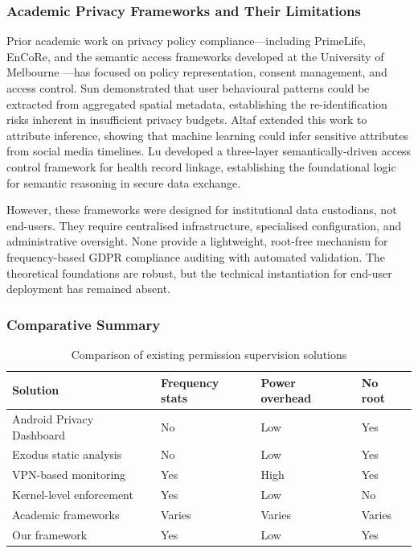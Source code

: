 \subsubsection{Academic Privacy Frameworks and Their Limitations}
Prior academic work on privacy policy compliance—including PrimeLife, EnCoRe, and the semantic access frameworks developed at the University of Melbourne \cite{15, 16, 17}—has focused on policy representation, consent management, and access control. Sun \cite{15} demonstrated that user behavioural patterns could be extracted from aggregated spatial metadata, establishing the re-identification risks inherent in insufficient privacy budgets. Altaf \cite{16} extended this work to attribute inference, showing that machine learning could infer sensitive attributes from social media timelines. Lu \cite{17} developed a three-layer semantically-driven access control framework for health record linkage, establishing the foundational logic for semantic reasoning in secure data exchange.

However, these frameworks were designed for institutional data custodians, not end-users. They require centralised infrastructure, specialised configuration, and administrative oversight. None provide a lightweight, root-free mechanism for frequency-based GDPR compliance auditing with automated validation. The theoretical foundations are robust, but the technical instantiation for end-user deployment has remained absent.

\subsubsection{Comparative Summary}
\begin{table}[H]
\centering
\caption{Comparison of existing permission supervision solutions}
\begin{tabular}{p{3cm}p{2.5cm}p{2.5cm}p{2.5cm}}
\toprule
\textbf{Solution} & \textbf{Frequency stats} & \textbf{Power overhead} & \textbf{No root} \\
\midrule
Android Privacy Dashboard & No & Low & Yes \\
Exodus static analysis & No & Low & Yes \\
VPN-based monitoring & Yes & High & Yes \\
Kernel-level enforcement & Yes & Low & No \\
Academic frameworks & Varies & Varies & Varies \\
Our framework & Yes & Low & Yes \\
\bottomrule
\end{tabular}
\end{table}

